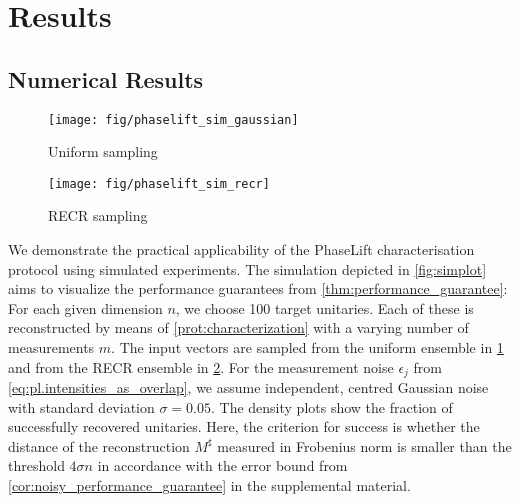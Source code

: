 \section{Results}
\subsection{Numerical Results}

\begin{figure*}[tbp]
  \begin{subfigure}{.475\columnwidth}
    \texttt{[image: fig/phaselift\_sim\_gaussian]}
    \caption{\label{sfig:simplot.gaussian}%
      Uniform sampling
    }
   \end{subfigure}
  \begin{subfigure}{.475\columnwidth}
    \texttt{[image: fig/phaselift\_sim\_recr]}
    \caption{\label{sfig:simplot.recr}%
      RECR sampling
    }
   \end{subfigure}
  \caption{\label{fig:simplot}%
    Simulated recovery-probability using the two different sampling schemes under noisy measurements with $\sigma = 0.05$.
    For each given dimension, the transfer matrices to be recovered consist of 97 Haar random unitaries as well as the identity, the swap-matrix, and the discrete Fourier transform.
    The red line indicates the conjectured phase transition at $4 n - 4$.
  }
\end{figure*}

We demonstrate the practical applicability of the PhaseLift characterisation protocol using simulated experiments.
The simulation depicted in \cref{fig:simplot} aims to visualize the performance guarantees from \cref{thm:performance_guarantee}:
For each given dimension $n$, we choose 100 target unitaries.
Each of these is reconstructed by means of \cref{prot:characterization} with a varying number of measurements $m$.
The input vectors are sampled from the uniform ensemble in \cref{sfig:simplot.gaussian} and from the RECR ensemble in \cref{sfig:simplot.recr}.
For the measurement noise $\epsilon_j$ from \cref{eq:pl.intensities_as_overlap}, we assume independent, centred Gaussian noise with standard deviation $\sigma = 0.05$.
The density plots show the fraction of successfully recovered unitaries.
Here, the criterion for success is whether the distance of the reconstruction $M^\sharp$ measured in Frobenius norm is smaller than the threshold  $4 \sigma n$ in accordance with the error bound from \cref{cor:noisy_performance_guarantee} in the supplemental material.

